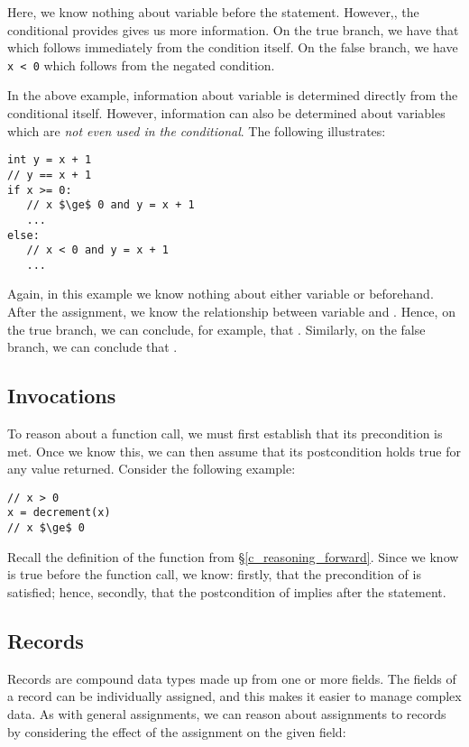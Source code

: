 Here, we know nothing about variable  before the statement.  However,, the conditional provides gives us more information.  On the true branch, we have that  which follows immediately from the condition itself.  On the false branch, we have \lstinline{x < 0} which follows from the negated condition.

In the above example, information about variable  is determined directly from the conditional itself.  However, information can also be determined about variables which are {\em not even used in the conditional}.  The following illustrates:

\begin{lstlisting}
int y = x + 1
// y == x + 1
if x >= 0:
   // x $\ge$ 0 and y = x + 1
   ...
else:
   // x < 0 and y = x + 1
   ...
\end{lstlisting}

Again, in this example we know nothing about either variable  or  beforehand.  After the assignment, we know the relationship between variable  and .  Hence, on the true branch, we can conclude, for example, that .  Similarly, on the false branch, we can conclude that .

\subsection{Invocations}

To reason about a function call, we must first establish that its precondition is met.  Once we know this, we can then assume that its postcondition holds true for any value returned.  Consider the following example:

\begin{lstlisting}
// x > 0
x = decrement(x)
// x $\ge$ 0
\end{lstlisting}

Recall the definition of the  function from \S\ref{c_reasoning_forward}.  Since we know  is true before the function call, we know: firstly, that the precondition of  is satisfied; hence, secondly, that the postcondition of  implies  after the statement.

\subsection{Records}
Records are compound data types made up from one or more fields.  The fields of a record can be individually assigned, and this makes it easier to manage complex data.  As with general assignments, we can reason about assignments to records by considering the effect of the assignment on the given field:

